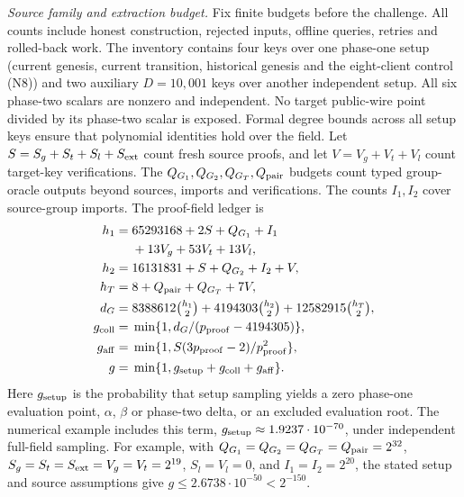 \documentclass[conference,compsoc]{IEEEtran}
\theoremstyle{definition}
\numberwithin{equation}{section}
\numberwithin{table}{section}
\numberwithin{figure}{section}
\theoremstyle{plain}
\begin{document}
\par\noindent\emph{Source family and extraction budget.}
\label{app:primitive-reductions}
Fix finite budgets before the challenge. All counts include honest
construction, rejected inputs, offline queries, retries and rolled-back work.
The inventory contains four keys over one phase-one setup (current genesis,
current transition, historical genesis and the eight-client control (N8)) and two auxiliary \(D=10{,}001\)
keys over another independent setup. All six phase-two scalars are nonzero
and independent. No target public-wire point divided by its phase-two
scalar is exposed. Formal degree bounds across all setup keys ensure that polynomial identities hold over the field.
Let \(S=S_g+S_t+S_l+S_{\rm ext}\) count fresh source proofs, and let \(V=V_g+V_t+V_l\) count target-key verifications. The \(Q_{G_1},Q_{G_2},Q_{G_T},Q_{\rm pair}\) budgets count typed group-oracle outputs beyond sources, imports and verifications. The counts \(I_1,I_2\) cover source-group imports. The proof-field ledger is
\begin{align}
 h_1={}&65293168+2S+Q_{G_1}+I_1\notag\\
       &+13V_g+53V_t+13V_l,\notag\\
 h_2={}&16131831+S+Q_{G_2}+I_2+V,\notag\\
 h_T={}&8+Q_{\rm pair}+Q_{G_T}+7V,\notag\\
 d_G={}&8388612\tbinom{h_1}{2}+4194303\tbinom{h_2}{2}
       +12582915\tbinom{h_T}{2},\notag\\
 g_{\rm coll}={}&\min\{1,d_G/(p_{\rm proof}-4194305)\},\notag\\
 g_{\rm aff}={}&\min\{1,S(3p_{\rm proof}-2)/p_{\rm proof}^2\},\notag\\
 g={}&\min\{1,g_{\rm setup}+g_{\rm coll}+g_{\rm aff}\}.
 \label{eq:groth-budget}
\end{align}
Here \(g_{\rm setup}\) is the probability that setup sampling yields a zero phase-one evaluation point, \(\alpha\), \(\beta\) or phase-two delta, or an excluded evaluation root. The numerical example includes this term, \(g_{\rm setup}\approx1.9237\cdot10^{-70}\), under independent full-field sampling.
For example, with \(Q_{G_1}=Q_{G_2}=Q_{G_T}=Q_{\rm pair}=2^{32}\), \(S_g=S_t=S_{\rm ext}=V_g=V_t=2^{19}\), \(S_l=V_l=0\), and \(I_1=I_2=2^{20}\), the stated setup and source assumptions give \(g\le 2.6738\cdot10^{-50}<2^{-150}\).
\end{document}
